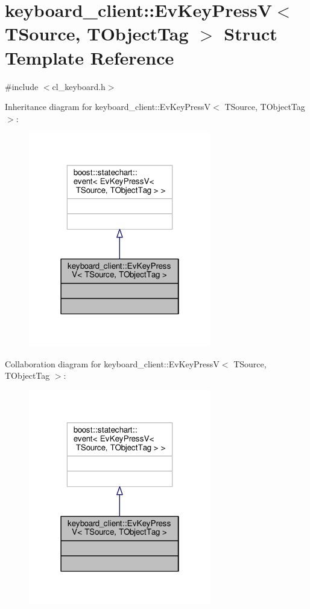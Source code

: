 \hypertarget{structkeyboard__client_1_1EvKeyPressV}{}\section{keyboard\+\_\+client\+:\+:Ev\+Key\+PressV$<$ T\+Source, T\+Object\+Tag $>$ Struct Template Reference}
\label{structkeyboard__client_1_1EvKeyPressV}


{\ttfamily \#include $<$cl\+\_\+keyboard.\+h$>$}



Inheritance diagram for keyboard\+\_\+client\+:\+:Ev\+Key\+PressV$<$ T\+Source, T\+Object\+Tag $>$\+:\nopagebreak
\begin{figure}[H]
\begin{center}
\leavevmode
\includegraphics[width=226pt]{structkeyboard__client_1_1EvKeyPressV__inherit__graph}
\end{center}
\end{figure}


Collaboration diagram for keyboard\+\_\+client\+:\+:Ev\+Key\+PressV$<$ T\+Source, T\+Object\+Tag $>$\+:\nopagebreak
\begin{figure}[H]
\begin{center}
\leavevmode
\includegraphics[width=226pt]{structkeyboard__client_1_1EvKeyPressV__coll__graph}
\end{center}
\end{figure}


